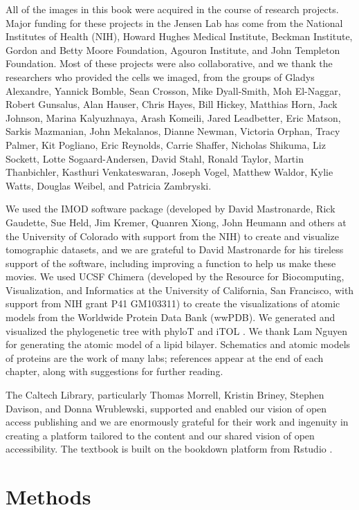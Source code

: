 \documentclass[]{tufte-book}
\begin{document}
All of the images in this book were acquired in the course of research
projects. Major funding for these projects in the Jensen Lab has come
from the National Institutes of Health (NIH), Howard Hughes Medical
Institute, Beckman Institute, Gordon and Betty Moore Foundation, Agouron
Institute, and John Templeton Foundation. Most of these projects were
also collaborative, and we thank the researchers who provided the cells
we imaged, from the groups of Gladys Alexandre, Yannick Bomble, Sean
Crosson, Mike Dyall-Smith, Moh El-Naggar, Robert Gunsalus, Alan Hauser,
Chris Hayes, Bill Hickey, Matthias Horn, Jack Johnson, Marina
Kalyuzhnaya, Arash Komeili, Jared Leadbetter, Eric Matson, Sarkis
Mazmanian, John Mekalanos, Dianne Newman, Victoria Orphan, Tracy Palmer,
Kit Pogliano, Eric Reynolds, Carrie Shaffer, Nicholas Shikuma, Liz
Sockett, Lotte Sogaard-Andersen, David Stahl, Ronald Taylor, Martin
Thanbichler, Kasthuri Venkateswaran, Joseph Vogel, Matthew Waldor, Kylie
Watts, Douglas Weibel, and Patricia Zambryski.

We used the IMOD software package (developed by David Mastronarde, Rick
Gaudette, Sue Held, Jim Kremer, Quanren Xiong, John Heumann and others
at the University of Colorado with support from the NIH) to create and
visualize tomographic datasets, and we are grateful to David Mastronarde
for his tireless support of the software, including improving a function
to help us make these movies. We used UCSF Chimera (developed by the
Resource for Biocomputing, Visualization, and Informatics at the
University of California, San Francisco, with support from NIH grant P41
GM103311) to create the visualizations of atomic models from the
Worldwide Protein Data Bank (wwPDB). We generated and visualized the
phylogenetic tree with phyloT and iTOL \citep{letunic2019}. We thank Lam
Nguyen for generating the atomic model of a lipid bilayer. Schematics
and atomic models of proteins are the work of many labs; references
appear at the end of each chapter, along with suggestions for further
reading.

The Caltech Library, particularly Thomas Morrell, Kristin Briney,
Stephen Davison, and Donna Wrublewski, supported and enabled our vision
of open access publishing and we are enormously grateful for their work
and ingenuity in creating a platform tailored to the content and our
shared vision of open accessibility. The textbook is built on the
bookdown platform from Rstudio \citep{xie2016}.

\chapter{Methods}\label{methods}
\end{document}

